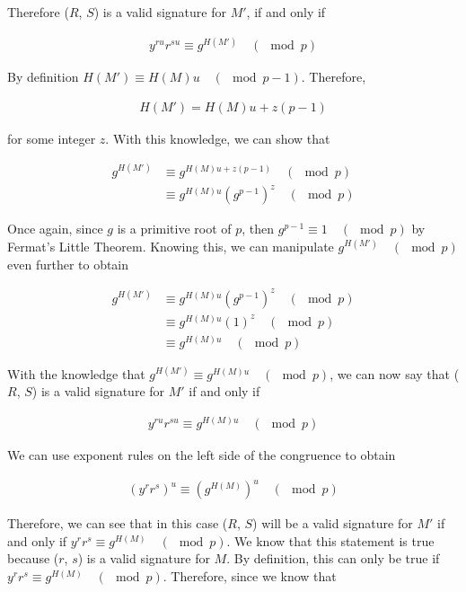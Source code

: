 \documentclass[11pt]{article}
\theoremstyle{definition}
\begin{document}
\begin{enumerate}
\begin{enumerate}
Therefore ($R$, $S$) is a valid signature for $M'$, if and only if 

\begin{align*}
    y^{ru}r^{su} \equiv g^{H(M')} \quad (\mod{p})
\end{align*}

By definition $H(M') \equiv H(M)u \quad (\mod{p - 1})$. Therefore,

\begin{align*}
    H(M') = H(M)u + z(p - 1)
\end{align*}

for some integer $z$. With this knowledge, we can show that

\begin{align*}
    g^{H(M')} &\equiv g^{H(M)u + z(p - 1)} \quad (\mod{p}) \\
    &\equiv g^{H(M)u} (g^{p - 1})^z \quad (\mod{p})
\end{align*}

Once again, since $g$ is a primitive root of $p$, then $g^{p - 1} \equiv 1 \quad (\mod{p})$ by Fermat's Little Theorem. Knowing this, we can manipulate $g^{H(M')} \quad (\mod{p})$ even further to obtain

\begin{align*}
    g^{H(M')}  &\equiv g^{H(M)u} (g^{p - 1})^z \quad (\mod{p}) \\
    &\equiv g^{H(M)u} (1)^z \quad (\mod{p}) \\
    &\equiv g^{H(M)u} \quad (\mod{p})
\end{align*}

With the knowledge that $g^{H(M')} \equiv g^{H(M)u} \quad (\mod{p})$, we can now say that ($R$, $S$) is a valid signature for $M'$ if and only if

\begin{align*}
    y^{ru}r^{su} \equiv g^{H(M)u} \quad (\mod{p})
\end{align*}

We can use exponent rules on the left side of the congruence to obtain

\begin{align*}
    (y^rr^s)^u \equiv (g^{H(M)})^u \quad (\mod{p})
\end{align*}

Therefore, we can see that in this case ($R$, $S$) will be a valid signature for $M'$ if and only if $y^rr^s \equiv g^{H(M)} \quad (\mod{p})$. We know that this statement is true because ($r$, $s$) is a valid signature for $M$. By definition, this can only be true if $y^rr^s \equiv g^{H(M)} \quad (\mod{p})$. Therefore, since we know that


\end{enumerate}
\end{enumerate}
\end{document}
